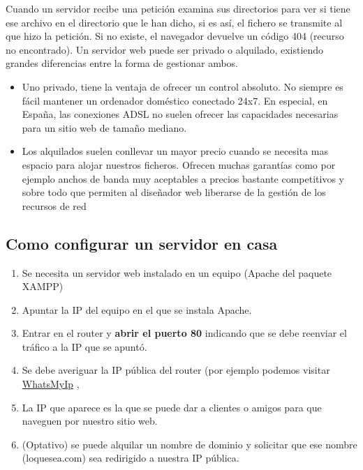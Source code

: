\documentclass[letterpaper,10pt,spanish]{sphinxmanual}
\begin{document}
Cuando un servidor recibe una petición examina sus directorios para ver si tiene ese archivo en
el directorio que le han dicho, si es así, el fichero se transmite al que hizo la petición. Si no existe, el navegador devuelve un código 404 (recurso no encontrado). Un servidor web puede ser privado o alquilado, existiendo grandes diferencias entre la forma de gestionar ambos.
\begin{itemize}
\item {} 
Uno privado, tiene la ventaja de ofrecer un control absoluto. No siempre es fácil mantener un ordenador doméstico conectado 24x7. En especial, en España, las  conexiones ADSL no suelen ofrecer las capacidades necesarias para un sitio web de tamaño mediano.

\item {} 
Los alquilados suelen conllevar un mayor precio cuando se necesita mas espacio para alojar nuestros ficheros. Ofrecen muchas garantías como por ejemplo anchos de banda muy aceptables a precios bastante competitivos y sobre todo que permiten al diseñador web liberarse de la gestión de los recursos de red

\end{itemize}


\subsection{Como configurar un servidor en casa}
\label{tema1:como-configurar-un-servidor-en-casa}\begin{enumerate}
\item {} 
Se necesita un servidor web instalado en un equipo (Apache del paquete XAMPP)

\item {} 
Apuntar la IP del equipo en el que se instala Apache.

\item {} 
Entrar en el router y \textbf{abrir el puerto 80} indicando que se debe reenviar el tráfico a la IP que se apuntó.

\item {} 
Se debe averiguar la IP pública del router (por ejemplo podemos visitar \href{http://whatsmyip.org}{WhatsMyIp} ,

\item {} 
La IP que aparece es la que se puede dar a clientes o amigos para que naveguen por nuestro sitio web.

\item {} 
(Optativo) se puede alquilar un nombre de dominio y solicitar que ese nombre (loquesea.com) sea redirigido a nuestra IP pública.

\end{enumerate}
\end{document}
